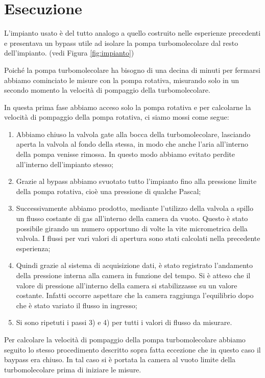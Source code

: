 \section{Esecuzione}

L'impianto usato è del tutto analogo a quello costruito nelle esperienze precedenti e presentava
un bypass utile ad isolare la pompa turbomolecolare dal resto dell'impianto. (vedi Figura \ref{fig:impianto})

Poiché la pompa turbomolecolare ha bisogno di una decina di minuti per fermarsi abbiamo cominciato le misure con la pompa rotativa,
misurando solo in un secondo momento la velocità di pompaggio della turbomolecolare.

In questa prima fase abbiamo acceso solo la pompa rotativa e per calcolarne la velocità di pompaggio della pompa rotativa, ci siamo mossi come segue:

\begin{enumerate}
	\item{Abbiamo chiuso la valvola gate alla bocca della turbomolecolare, lasciando aperta la valvola al fondo della stessa,
        in modo che anche l'aria all'interno della pompa venisse rimossa. In questo modo abbiamo evitato perdite
        all'interno dell'impianto stesso;}
	\item{Grazie al bypass abbiamo svuotato tutto l'impianto fino alla pressione limite della pompa rotativa,
        cioè una pressione di qualche Pascal;}
	\item{Successivamente abbiamo prodotto, mediante l'utilizzo della valvola a spillo un flusso
        costante di gas all'interno della camera da vuoto. Questo è stato possibile girando un numero opportuno
        di volte la vite micrometrica della valvola. I flussi per vari valori di apertura sono stati calcolati nella precedente
        esperienza;}
	\item{Quindi grazie al sistema di acquisizione dati, è stato registrato l'andamento della pressione interna alla
        camera in funzione del tempo.  Si è atteso che il valore di pressione all'interno della camera si
        stabilizzasse su un valore costante. Infatti occorre aspettare che la camera raggiunga l'equilibrio
        dopo che è stato variato il flusso in ingresso;}
	\item{Si sono ripetuti i passi 3) e 4) per tutti i valori di flusso da misurare.}
\end{enumerate}

Per calcolare la velocità di pompaggio della pompa turbomolecolare abbiamo seguito lo stesso procedimento
descritto sopra fatta eccezione che in questo caso il baypass era chiuso. In tal caso
si è portata la camera al vuoto limite della turbomolecolare prima di iniziare le misure.

